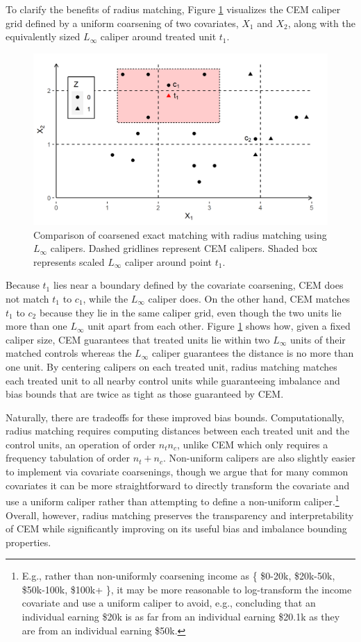\documentclass{article}
\begin{document}
To clarify the benefits of radius matching, Figure \ref{fig:vs_cem} visualizes the CEM caliper grid defined by a uniform coarsening of two covariates, $X_1$ and $X_2$,
along with the equivalently sized $L_\infty$ caliper around treated unit $t_1$.
\begin{figure}[t]
    \centering
    \includegraphics[width=\textwidth]{writeup/figures/show_cem_calipers.png}
    \caption{Comparison of coarsened exact matching with radius matching using $L_\infty$ calipers.
    Dashed gridlines represent CEM calipers.
    Shaded box represents scaled $L_\infty$ caliper around point $t_1$.}
    \label{fig:vs_cem}
\end{figure}
Because $t_1$ lies near a boundary defined by the covariate coarsening, CEM does not match $t_1$ to $c_1$, while the $L_\infty$ caliper does.
On the other hand, CEM matches $t_1$ to $c_2$ because they lie in the same caliper grid, even though the two units lie more than one $L_\infty$ unit apart from each other.
Figure \ref{fig:vs_cem} shows how, given a fixed caliper size, CEM guarantees that treated units lie within two $L_\infty$ units of their matched controls whereas the $L_\infty$ caliper guarantees the distance is no more than one unit.
By centering calipers on each treated unit, radius matching matches each treated unit to all nearby control units while guaranteeing imbalance and bias bounds that are twice as tight as those guaranteed by CEM.

Naturally, there are tradeoffs for these improved bias bounds.
Computationally, radius matching requires computing distances between each treated unit and the control units, an operation of order $n_t n_c$, unlike CEM which only requires a frequency tabulation of order $n_t+n_c$.
Non-uniform calipers are also slightly easier to implement via covariate coarsenings, though we argue that for many common covariates it can be more straightforward to directly transform the covariate and use a uniform caliper rather than attempting to define a non-uniform caliper.\footnote{E.g., rather than non-uniformly coarsening income as \{ \$0-20k, \$20k-50k, \$50k-100k, \$100k+ \}, it may be more reasonable to log-transform the income covariate and use a uniform caliper to avoid, e.g., concluding that an individual earning \$20k is as far from an individual earning \$20.1k as they are from an individual earning \$50k.}
Overall, however, radius matching preserves the transparency and interpretability of CEM while significantly improving on its useful bias and imbalance bounding properties.
\end{document}
